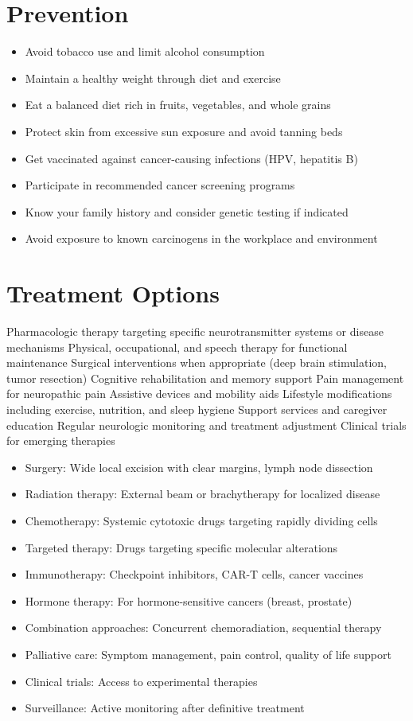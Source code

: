 \section{Prevention}
\begin{itemize}[noitemsep]
  \item Avoid tobacco use and limit alcohol consumption
  \item Maintain a healthy weight through diet and exercise
  \item Eat a balanced diet rich in fruits, vegetables, and whole grains
  \item Protect skin from excessive sun exposure and avoid tanning beds
  \item Get vaccinated against cancer-causing infections (HPV, hepatitis B)
  \item Participate in recommended cancer screening programs
  \item Know your family history and consider genetic testing if indicated
  \item Avoid exposure to known carcinogens in the workplace and environment
\end{itemize}
\section{Treatment Options}
Pharmacologic therapy targeting specific neurotransmitter systems or disease mechanisms Physical, occupational, and speech therapy for functional maintenance Surgical interventions when appropriate (deep brain stimulation, tumor resection) Cognitive rehabilitation and memory support Pain management for neuropathic pain Assistive devices and mobility aids Lifestyle modifications including exercise, nutrition, and sleep hygiene Support services and caregiver education Regular neurologic monitoring and treatment adjustment Clinical trials for emerging therapies

\begin{itemize}[noitemsep]
  \item Surgery: Wide local excision with clear margins, lymph node dissection
  \item Radiation therapy: External beam or brachytherapy for localized disease
  \item Chemotherapy: Systemic cytotoxic drugs targeting rapidly dividing cells
  \item Targeted therapy: Drugs targeting specific molecular alterations
  \item Immunotherapy: Checkpoint inhibitors, CAR-T cells, cancer vaccines
  \item Hormone therapy: For hormone-sensitive cancers (breast, prostate)
  \item Combination approaches: Concurrent chemoradiation, sequential therapy
  \item Palliative care: Symptom management, pain control, quality of life support
  \item Clinical trials: Access to experimental therapies
  \item Surveillance: Active monitoring after definitive treatment
\end{itemize}
